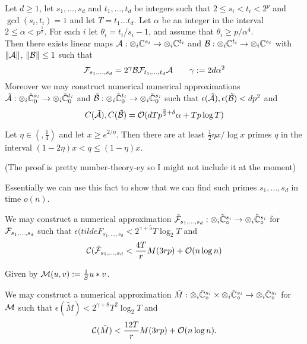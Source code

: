 \begin{theorem}
    Let $d \geq 1$, let $s_1, \ldots, s_d$ and $t_1, \ldots, t_d$ be integers such that $2 \leq s_i < t_i < 2^p$ and $\gcd(s_i, t_i) = 1$ and let $T = t_1\ldots t_d$. Let $\alpha$ be an integer in the interval $2 \leq \alpha < p^{\frac{1}{2}}$. For each $i$ let $\theta_i = t_i / s_i - 1$, and assume that $\theta_i \geq p/\alpha^4$.\\
    Then there exists linear maps $\mathcal A: \otimes_i {\mathbb C}^{s_i} \to \otimes_i {\mathbb C}^{t_i}$ and $\mathcal B: \otimes_i {\mathbb C}^{t_i} \to \otimes_i {\mathbb C}^{s_i}$ with $\|\mathcal A\|$, $\|\mathcal B\| \leq 1$ such that
    \[
        \mathcal F_{s_1, \ldots, s_d} = 2^\gamma \mathcal B \mathcal F_{t_1, \ldots, t_d} \mathcal A \qquad \gamma := 2d\alpha^2
    \]
    Moreover we may construct numerical numerical approximations $\tilde{\mathcal A}: \otimes_i \tilde{{\mathbb C}}^{s_i}_0 \to \otimes_i \tilde{{\mathbb C}}^{t_i}_0$ and $\tilde{\mathcal B}: \otimes_i \tilde{{\mathbb C}}^{t_i}_0 \to \otimes_i \tilde{{\mathbb C}}^{s_i}_0$  such that $\epsilon(\tilde{\mathcal A}), \epsilon(\tilde{\mathcal B}) < dp^2$ and
    \[
        C(\tilde{\mathcal A}), C(\tilde{\mathcal B}) = \mathcal O(dTp^{{\frac{3}{2}} + \delta}\alpha + Tp\log T)
    \]
\end{theorem}

\begin{lemma}
    Let $\eta \in (, \frac{1}{4})$ and let $x \geq e^{2/\eta}$. Then there are at least $\frac{1}{2}\eta x / \log x$ primes $q$ in the interval $(1 - 2\eta) x < q \leq ( 1 - \eta) x$.
\end{lemma}
(The proof is pretty number-theory-ey so I might not include it at the moment)

Essentially we can use this fact to show that we can find such primes $s_1, \ldots, s_d$ in time $o(n)$.

\begin{proposition}
    We may construct a numerical approximation $\tilde{\mathcal F}_{s_1, \ldots, s_d}: \otimes_i \tilde{{\mathbb C}}_\circ^{s_i} \to \otimes_i \tilde{{\mathbb C}}_\circ^{s_i}$ for $\mathcal F_{s_1, \ldots, s_d}$ such that $\epsilon(tilde{F}_{s_1, \ldots, s_d} < 2^{\gamma + 5} T \log_2 T$ and 
    \[
        \mathcal C(\tilde{\mathcal F}_{s_1, \ldots, s_d} < \frac{4T}{r} M(3rp) + \mathcal O(n \log n)
    \]
\end{proposition}

Given by $\mathcal M(u, v) := \frac{1}{S}u \ast v$. 

\begin{proposition}
    We may construct a numerical approximation $\tilde{M}: \otimes_i \tilde{{\mathbb C}}_\circ^{s_i} \times \otimes_i \tilde{{\mathbb C}}_\circ^{s_i} \to \otimes_i \tilde{{\mathbb C}}_\circ^{s_i}$ for $\mathcal M$ such that $\epsilon(\tilde{M}) < 2^{\gamma + 8}T^2 \log_2T$ and 
    \[
        \mathcal C(\tilde{M}) < \frac{12T}{r} M(3rp) + \mathcal O(n \log n).
    \]
\end{proposition}

